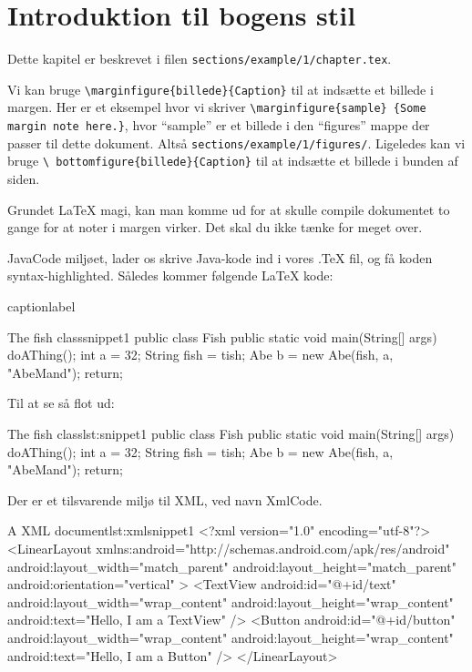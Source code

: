 \chapter{Introduktion til bogens stil}
Dette kapitel er beskrevet i filen \texttt{sections/example/1/chapter.tex}.

\vspace{5mm}

Vi kan bruge \texttt{\textbackslash marginfigure\{billede\}\{Caption\}} til at 
indsætte et billede i margen. Her er et eksempel hvor vi skriver 
\texttt{\textbackslash marginfigure\{sample\} \{Some margin note here.\}}, hvor 
``sample'' er et billede i den ``figures'' mappe der passer til dette dokument. 
Altså \texttt{sections/example/1/figures/}. 
Ligeledes kan vi bruge \texttt{\textbackslash 
bottomfigure\{billede\}\{Caption\}} 
til at indsætte et billede i bunden af siden.

Grundet \LaTeX\xspace magi, kan man komme ud for at skulle compile dokumentet 
to gange for at noter i margen virker. Det skal du ikke tænke for meget over.

\clearpage

JavaCode miljøet, lader os skrive Java-kode ind i vores .TeX fil, og få koden 
syntax-highlighted. Således kommer følgende LaTeX kode:
\begin{LaTeXCode}{caption}{label}
\begin{JavaCode}{The fish class}{snippet1}
	public class Fish {
		public static void main(String[] args) {
			doAThing();
			int a = 32;
			String fish = tish;
			Abe b = new Abe(fish, a, "AbeMand");
			return;
		}
	}
\end{JavaCode}
\end{LaTeXCode}
Til at se så flot ud:
\begin{JavaCode}{The fish class}{lst:snippet1}
	public class Fish {
		public static void main(String[] args) {
			doAThing();
			int a = 32;
			String fish = tish;
			Abe b = new Abe(fish, a, "AbeMand");
			return;
		}
	}
\end{JavaCode}

Der er et tilsvarende miljø til XML, ved navn XmlCode.
\begin{XmlCode}{A XML document}{lst:xmlsnippet1}
	<?xml version="1.0" encoding="utf-8"?>
	<LinearLayout 
		xmlns:android="http://schemas.android.com/apk/res/android"
		android:layout_width="match_parent"
		android:layout_height="match_parent"
		android:orientation="vertical" >
		<TextView android:id="@+id/text"
			android:layout_width="wrap_content"
			android:layout_height="wrap_content"
			android:text="Hello, I am a TextView" />
		<Button android:id="@+id/button"
			android:layout_width="wrap_content"
			android:layout_height="wrap_content"
			android:text="Hello, I am a Button" />
	</LinearLayout>
\end{XmlCode}

